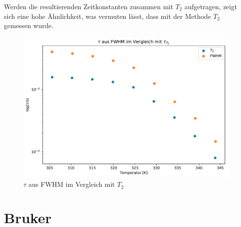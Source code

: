 Werden die resultierenden Zeitkonstanten zusammen mit $T_2$ aufgetragen, zeigt sich eine hohe Ähnlichkeit, was vermuten lässt, dass mit der Methode $T_2$ gemessen wurde.
\begin{figure}
	\begin{center}
		\includegraphics[width=\textwidth]{graphics/plots/SPEKDYN/spekdyn_t2.pdf}
	\end{center}
	\caption{$\tau$ aus FWHM im Vergleich mit $T_2$} \label{fig:res:spekdyn_t2}
\end{figure}



\section{Bruker} \label{section:res:bruker}

